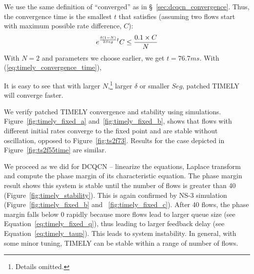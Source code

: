 We use the same definition of ``converged'' as in
\S~\ref{sec:dcqcn_convergence}. Thus, the convergence
time is the smallest $t$ that satisfies (assuming two flows start with maximum possible rate difference, $C$):
\begin{equation}
\small
{e^{\frac{{\delta (1 - N)}}{{2Seg}}t}}C \le \frac{{0.1 \times C}}{N}
\label{eq:timely_convergence_time}
\end{equation}
With $N=2$ and parameters we choose earlier, we get $t = 76.7ms$. With (\ref{eq:timely_convergence_time}), 
\fi

It is easy to see that
with larger $N$,\footnote{Details omitted.} larger $\delta$ or smaller $Seg$, patched TIMELY will converge faster.

We verify patched TIMELY convergence and stability using simulations.
Figure~\ref{fig:timely_fixed_a} and~\ref{fig:timely_fixed_b}, shows that flows
with different initial rates converge to the fixed point and are stable without
oscillation, opposed to Figure~\ref{fig:ts2f73}. Results for the case depicted
in Figure~\ref{fig:ts2f55time} are similar.

 We proceed as we did for DCQCN -- linearize the equations,
Laplace transform and compute the phase margin of its characteristic equation.
The phase margin result shows this system is stable until the number of flows is
greater than 40 (Figure~\ref{fig:timely_stability}).  This is again confirmed by
NS-3 simulation (Figure~\ref{fig:timely_fixed_b} and ~\ref{fig:timely_fixed_c}).
After 40 flows, the phase margin falls below 0 rapidly because more flows lead
to larger queue size (see Equation~\ref{eq:timely_fixed_q}), thus leading to
larger feedback delay (see Equation~\ref{eq:timely_taup}).  This leads to system
instability. In general, with some minor tuning, TIMELY can be stable within a
range of number of flows.
